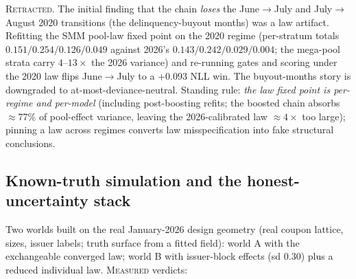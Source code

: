\textsc{Retracted.} The initial finding that the chain \emph{loses} the
June$\to$July and July$\to$August 2020 transitions (the delinquency-buyout
months) was a law artifact. Refitting the SMM pool-law fixed point on the 2020
regime (per-stratum totals $0.151/0.254/0.126/0.049$ against 2026's
$0.143/0.242/0.029/0.004$; the mega-pool strata carry $4$--$13\times$ the 2026
variance) and re-running gates and scoring under the 2020 law flips
June$\to$July to a $+0.093$ NLL win. The buyout-months story is downgraded to
at-most-deviance-neutral. Standing rule: \emph{the law fixed point is
per-regime and per-model} (including post-boosting refits; the boosted chain
absorbs $\approx$77\% of pool-effect variance, leaving the 2026-calibrated law
$\approx4\times$ too large); pinning a law across regimes converts law
misspecification into fake structural conclusions.

\subsection{Known-truth simulation and the honest-uncertainty stack}
\label{sec:aug6-sims}

Two worlds built on the real January-2026 design geometry (real coupon
lattice, sizes, issuer labels; truth surface from a fitted field): world A
with the exchangeable converged law; world B with issuer-block effects (sd
0.30) plus a reduced individual law. \textsc{Measured} verdicts:

